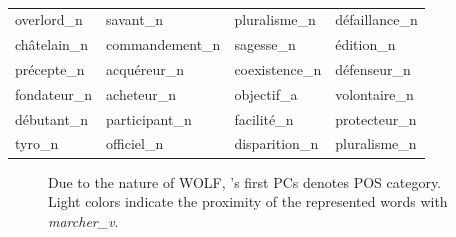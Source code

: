 \begin{table}
\begin{tabularx}{\textwidth}{*{4}{P{.23\textwidth}}}
overlord\_n & savant\_n & pluralisme\_n & défaillance\_n\\
châtelain\_n & commandement\_n & sagesse\_n & édition\_n\\
précepte\_n & acquéreur\_n & coexistence\_n & défenseur\_n\\
fondateur\_n & acheteur\_n & objectif\_a & volontaire\_n\\
débutant\_n & participant\_n & facilité\_n & protecteur\_n\\
tyro\_n & officiel\_n & disparition\_n & pluralisme\_n\\
\bottomrule
    \end{tabularx}
    \caption[Exemplar Neighborhoods in French Semantic Embeddings]{}
    \label{tab:freNeighbour}
    \end{table}


\begin{figure}
    \centering
    \begin{minipage}[t]{.5\textwidth}
        \centering
        \caption[French  Space Visualization]{Due to the nature of WOLF, 
        's first PCs denotes POS category. Light colors indicate the proximity of the represented words with \emph{marcher\_v}.}
        \label{fig:freSIMmarcher}

\end{minipage}
\end{figure}
